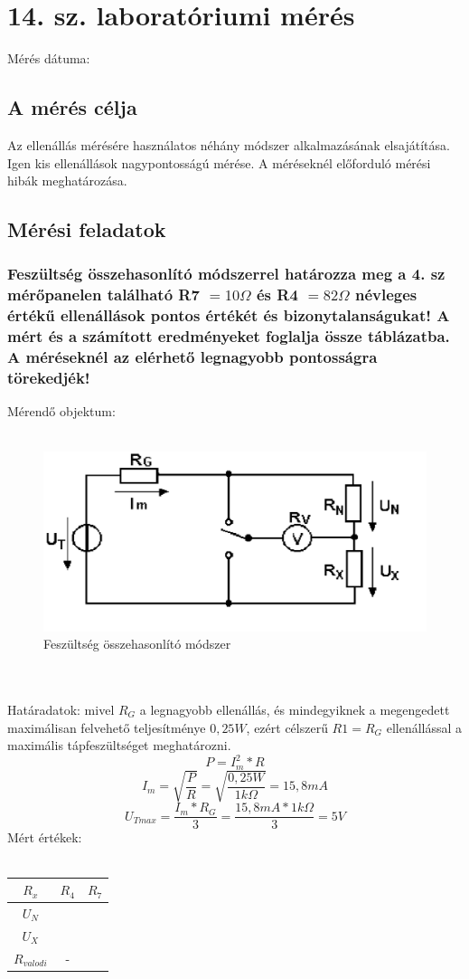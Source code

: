 \documentclass[10pt,a4paper]{article}
\begin{document}
\section{14. sz. laboratóriumi mérés}
	Mérés dátuma:\date{2017.10.02}
	\subsection{A mérés célja}
	Az ellenállás mérésére használatos néhány módszer alkalmazásának elsajátítása. Igen kis ellenállások nagypontosságú mérése.
A méréseknél előforduló mérési hibák meghatározása.
	\subsection{Mérési feladatok}
		\subsubsection{Feszültség összehasonlító módszerrel határozza meg a 4. sz
mérőpanelen található R7 $= 10 \Omega $ és R4 $= 82 \Omega $ névleges értékű ellenállások pontos értékét és bizonytalanságukat!
A mért és a számított eredményeket foglalja össze táblázatba. A méréseknél
az elérhető legnagyobb pontosságra törekedjék!}
		Mérendő objektum:
		\\\\
		\begin{figure}[hbtp]
		\centering
		\includegraphics[scale=0.5]{teljes/fesz_ossze.png}
		\caption{Feszültség összehasonlító módszer}
		\end{figure}
		\\\\
		Határadatok: mivel $R_G$ a legnagyobb ellenállás, és mindegyiknek a megengedett maximálisan felvehető teljesítménye $0,25 W$, ezért célszerű $R1 = R_G$ ellenállással a maximális tápfeszültséget meghatározni.
		$$P = I^2_{m} * R$$
		$$I_m = \sqrt{\frac{P}{R}} = \sqrt{\frac{0,25W}{1k\Omega}} = 15,8 mA$$
		$$U_{Tmax} = \frac{I_m * R_G}{3} = \frac{15,8 mA * 1 k\Omega}{3} = 5 V$$
		Mért értékek:\\\\
		\begin{tabular}{|c|c|c|}
		\hline 
		$R_x$ & $R_4$ & $R_7$ \\ 
		\hline 
		$U_N$ &  &  \\ 
		\hline 
		$U_X$ &  &  \\ 
		\hline 
		$R_{valodi}$ & - &  \\ 
		\hline 
		\end{tabular} 
		\\\\ 
		
\end{document}
